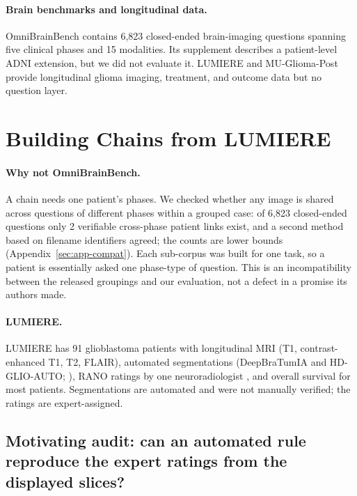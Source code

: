 \documentclass[11pt]{article}
\begin{document}
\paragraph{Brain benchmarks and longitudinal data.} OmniBrainBench \citep{peng2026omnibrainbench} contains 6,823 closed-ended brain-imaging questions spanning five clinical phases and 15 modalities. Its supplement describes a patient-level ADNI extension, but we did not evaluate it. LUMIERE \citep{suter2022lumiere} and MU-Glioma-Post \citep{muglioma2025post} provide longitudinal glioma imaging, treatment, and outcome data but no question layer.





\section{Building Chains from LUMIERE}
\label{sec:lumiere}

\paragraph{Why not OmniBrainBench.} A chain needs one patient's phases. We checked whether any image is shared across questions of different phases within a grouped case: of 6,823 closed-ended questions only 2 verifiable cross-phase patient links exist, and a second method based on filename identifiers agreed; the counts are lower bounds (Appendix~\ref{sec:app-compat}). Each sub-corpus was built for one task, so a patient is essentially asked one phase-type of question. This is an incompatibility between the released groupings and our evaluation, not a defect in a promise its authors made.

\paragraph{LUMIERE.} LUMIERE \citep{suter2022lumiere} has 91 glioblastoma patients with longitudinal MRI (T1, contrast-enhanced T1, T2, FLAIR), automated segmentations (DeepBraTumIA and HD-GLIO-AUTO; \citealp{suter2022lumiere, kickingereder2019automated}), RANO ratings by one neuroradiologist \citep{wen2010updated}, and overall survival for most patients. Segmentations are automated and were not manually verified; the ratings are expert-assigned.

\subsection{Motivating audit: can an automated rule reproduce the expert ratings from the displayed slices?}
\label{sec:audit}
\end{document}
